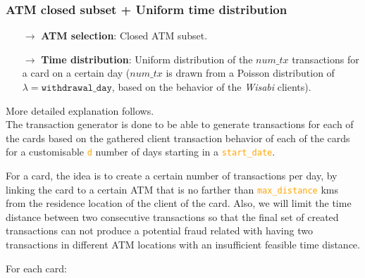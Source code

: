 \documentclass{article}
\begin{document}
\subsubsection{ATM closed subset + Uniform time distribution}

\begin{tcolorbox}
  \begin{itemize}
    \item[$\rightarrow$] \textbf{ATM selection}: Closed ATM subset.
    \item[$\rightarrow$] \textbf{Time distribution}: Uniform distribution of the $num\_tx$ transactions 
    for a card on a certain day ($num\_tx$ is drawn from a Poisson distribution of 
    $\lambda = \texttt{withdrawal\_day}$, based on the behavior of the \emph{Wisabi} clients).
  \end{itemize}
\end{tcolorbox}

More detailed explanation follows.
\\


The transaction generator is done to be able to generate transactions for 
each of the cards based on the gathered client transaction behavior of each of the cards 
for a customisable \textcolor{orange}{\texttt{d}} number of days starting in a 
\textcolor{orange}{\texttt{start\_date}}. 

For a card, the idea is to create a certain 
number of transactions per day, by linking the card to a certain ATM that is no farther 
than \textcolor{orange}{\texttt{max\_distance}} kms from the residence location of the 
client of the card. Also, we will limit the time distance between two consecutive 
transactions so that the final set of created transactions can not produce a potential 
fraud related with having two transactions in different ATM locations with an insufficient 
feasible time distance.

For each card:  
\end{document}
